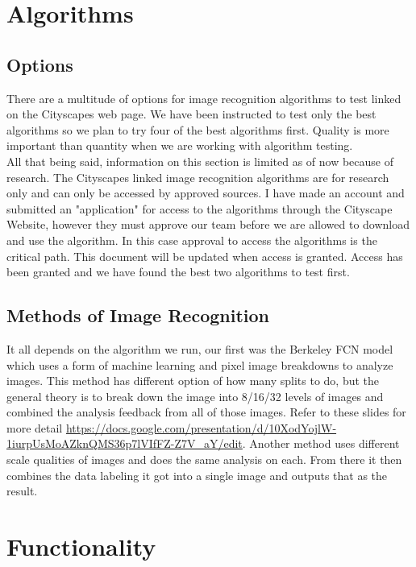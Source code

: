 \documentclass[10pt,draftclsnofoot,onecolumn,journal,compsoc]{IEEEtran}
\begin{document}
	
	
	
	\section{Algorithms}
	\subsection{Options}
	There are a multitude of options for image recognition algorithms to test linked on the Cityscapes web page. We have been instructed to test only the best algorithms so we plan to try four of the best algorithms first. Quality is more important than quantity when we are working with algorithm testing. \\
	All that being said, information on this section is limited as of now because of research. The Cityscapes linked image recognition algorithms are for research only and can only be accessed by approved sources. I have made an account and submitted an "application" for access to the algorithms through the Cityscape Website, however they must approve our team before we are allowed to download and use the algorithm. In this case approval to access the algorithms is the critical path. This document will be updated when access is granted. Access has been granted and we have found the best two algorithms to test first. 
	\subsection{Methods of Image Recognition}
	It all depends on the algorithm we run, our first was the Berkeley FCN model which uses a form of machine learning and pixel image breakdowns to analyze images. This method has different option of how many splits to do, but the general theory is to break down the image into 8/16/32 levels of images and combined the analysis feedback from all of those images. Refer to these slides for more detail \url{https://docs.google.com/presentation/d/10XodYojlW-1iurpUsMoAZknQMS36p7lVIfFZ-Z7V_aY/edit}. Another method uses different scale qualities of images and does the same analysis on each. From there it then combines the data labeling it got into a single image and outputs that as the result. 
	
	
	\section{Functionality}
\end{document}
